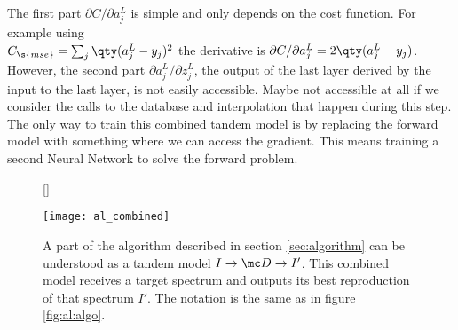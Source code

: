 The first part $\partial C / \partial{a^L_j}$ is simple and only depends on the cost function. For example using \\
$C_\s{mse} = \sum_j \qty(a_j^L - y_j)^2$
the derivative is 
$\partial{C} / \partial{a^L_j} = 2 \qty(a_j^L - y_j)$.
However, the second part 
$\partial{a^L_j} / \partial{z^L_j}$,
the output of the last layer derived by the input to the last layer, is not easily accessible. Maybe not accessible at all if we consider the calls to the database and interpolation that happen during this step. The only way to train this combined tandem model is by replacing the forward model with something where we can access the gradient. This means training a second Neural Network to solve the forward problem.

\begin{figure}[H]
    [\FBwidth]
    {\caption{
        A part of the algorithm described in section \ref{sec:algorithm} can be understood as a tandem model 
        $I \rightarrow \mc D \rightarrow I'$.
        This combined model receives a target spectrum and outputs its best reproduction of that spectrum $I'$. The notation is the same as in figure \ref{fig:al:algo}.
    }
    \label{fig:al:combined}}
    {\texttt{[image: al\_combined]}}
\end{figure}


